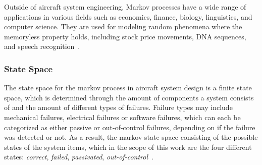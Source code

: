 Outside of aircraft system engineering, Markov processes have a wide range of applications in various fields such as economics, finance, biology, linguistics,
and computer science.
They are used for modeling random phenomena where the memoryless property holds,
including stock price movements, DNA sequences, and speech recognition~\cite{markov-usage}.

\subsubsection{State Space}\label{subsubsec:state-space}
The state space for the markov process in aircraft system design is a finite state space, which is determined through the amount of components
a system consists of and the amount of different types of failures.
Failure types may include mechanical failures, electrical failures or software failures, which can each be categorized as either
passive or out-of-control failures, depending on if the failure was detected or not.
As a result, the markov state space consisting of the possible states of the system items, which in the scope of
this work are the four different states: \textit{correct}, \textit{failed}, \textit{passivated}, \textit{out-of-control}~\cite{markov-processes}.

